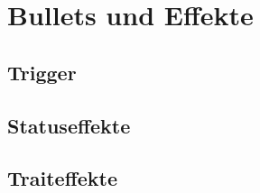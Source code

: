 
\section{Bullets und Effekte}\label{sec:bullets-und-effekte}

\renewcommand{\kapitelautor}{Autor: Irgendwer} %

\subsection{Trigger}\label{subsec:trigger}

%
%

\subsection{Statuseffekte}\label{subsec:statuseffekte}

%
%

\subsection{Traiteffekte}\label{subsec:traiteffekte}

%
%

\renewcommand{\kapitelautor}{}
